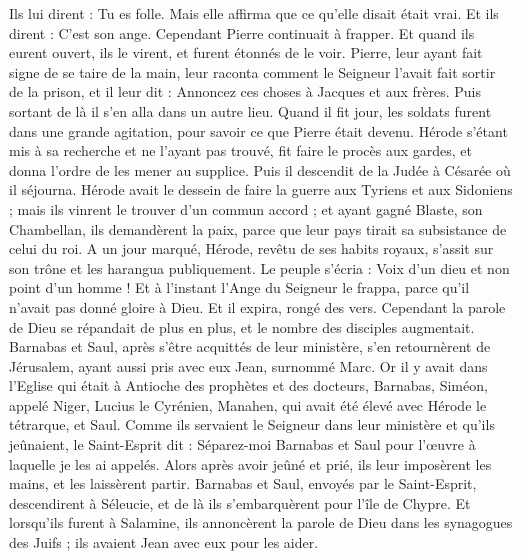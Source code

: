 \begin{multicols}{2}
{Ils lui dirent : Tu es folle. Mais elle affirma que ce qu'elle disait était vrai.
Et ils dirent : C'est son ange. Cependant Pierre continuait à frapper. Et quand ils eurent ouvert, ils le virent, et furent étonnés de le voir.
Pierre, leur ayant fait signe de se taire de la main, leur raconta comment le Seigneur l'avait fait sortir de la prison, et il leur dit : Annoncez ces choses à Jacques et aux frères. Puis sortant de là il s'en alla dans un autre lieu.
Quand il fit jour, les soldats furent dans une grande agitation, pour savoir ce que Pierre était devenu.
Hérode s'étant mis à sa recherche et ne l'ayant pas trouvé, fit faire le procès aux gardes, et donna l'ordre de les mener au supplice. Puis il descendit de la Judée à Césarée où il séjourna.
Hérode avait le dessein de faire la guerre aux Tyriens et aux Sidoniens ; mais ils vinrent le trouver d'un commun accord ; et ayant gagné Blaste, son Chambellan, ils demandèrent la paix, parce que leur pays tirait sa subsistance de celui du roi.
A un jour marqué, Hérode, revêtu de ses habits royaux, s'assit sur son trône et les harangua publiquement.
Le peuple s'écria : Voix d'un dieu et non point d'un homme !
Et à l'instant l'Ange du Seigneur le frappa, parce qu'il n'avait pas donné gloire à Dieu. Et il expira, rongé des vers.
Cependant la parole de Dieu se répandait de plus en plus, et le nombre des disciples augmentait.
Barnabas et Saul, après s'être acquittés de leur ministère, s'en retournèrent de Jérusalem, ayant aussi pris avec eux Jean, surnommé Marc.
\VerseOne{}Or il y avait dans l'Eglise qui était à Antioche des prophètes et des docteurs, Barnabas, Siméon, appelé Niger, Lucius le Cyrénien, Manahen, qui avait été élevé avec Hérode le tétrarque, et Saul.
Comme ils servaient le Seigneur dans leur ministère et qu'ils jeûnaient, le Saint-Esprit dit : Séparez-moi Barnabas et Saul pour l'œuvre à laquelle je les ai appelés.
Alors après avoir jeûné et prié, ils leur imposèrent les mains, et les laissèrent partir.
Barnabas et Saul, envoyés par le Saint-Esprit, descendirent à Séleucie, et de là ils s'embarquèrent pour l'île de Chypre.
Et lorsqu'ils furent à Salamine, ils annoncèrent la parole de Dieu dans les synagogues des Juifs ; ils avaient Jean avec eux pour les aider.
}
\end{multicols}

